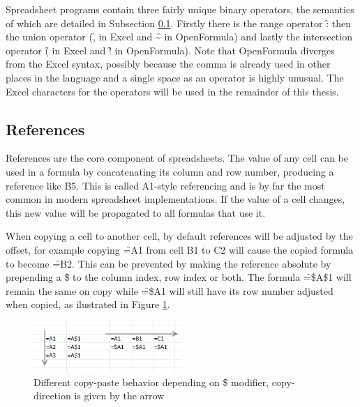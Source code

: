 Spreadsheet programs contain three fairly unique binary operators, the semantics of which are detailed in Subsection \ref{sec:references}.
Firstly there is the range operator \f{:} then the union operator (\f{,} in Excel and \f{\textasciitilde} in OpenFormula) and lastly the intersection operator (\f{} in Excel and \f{!} in OpenFormula).
Note that OpenFormula diverges from the Excel syntax, possibly because the comma is already used in other places in the language and a single space as an operator is highly unusual.
The Excel characters for the operators will be used in the remainder of this thesis.

\subsection{References}
\label{sec:references}
References are the core component of spreadsheets.
The value of any cell can be used in a formula by concatenating its column and row number, producing a reference like \f{B5}.
This is called A1-style referencing and is by far the most common in modern spreadsheet implementations.
If the value of a cell changes, this new value will be propagated to all formulas that use it.

When copying a cell to another cell, by default references will be adjusted by the offset, for example copying \f{=A1} from cell B1 to C2 will cause the copied formula to become \f{=B2}.
This can be prevented by making the reference absolute by prepending a \f{\$} to the column index, row index or both.
The formula \f{=\$A\$1} will remain the same on copy while \f{=\$A1} will still have its row number adjusted when copied, as ilustrated in Figure \ref{fig:copy-modifiers}.

\begin{figure}
\centerfloat
\includegraphics[width=0.5\textwidth]{anatomy/copying}
\caption{Different copy-paste behavior depending on \f{\$} modifier, copy-direction is given by the arrow}
\label{fig:copy-modifiers}
\end{figure}


